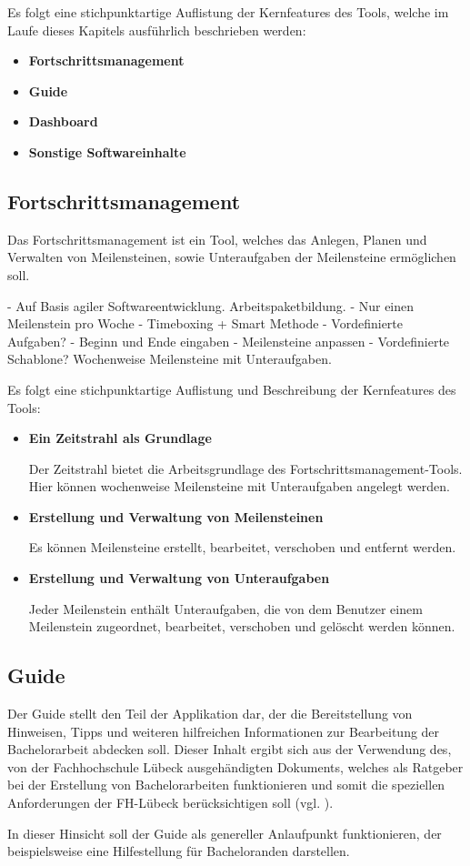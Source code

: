 \documentclass{scrreprt}
\begin{document}
\par Es folgt eine stichpunktartige Auflistung der Kernfeatures des Tools, welche im Laufe dieses Kapitels ausführlich beschrieben werden:

\begin{itemize}
\item \textbf{Fortschrittsmanagement}
\item \textbf{Guide}
\item \textbf{Dashboard}
\item \textbf{Sonstige Softwareinhalte}
\end{itemize}

\subsection{Fortschrittsmanagement}
Das Fortschrittsmanagement ist ein Tool, welches das Anlegen, Planen und Verwalten von Meilensteinen, sowie Unteraufgaben der Meilensteine ermöglichen soll. 

- Auf Basis agiler Softwareentwicklung. Arbeitspaketbildung.
- Nur einen Meilenstein pro Woche
- Timeboxing + Smart Methode
- Vordefinierte Aufgaben?
- Beginn und Ende eingaben
- Meilensteine anpassen
- Vordefinierte Schablone? Wochenweise Meilensteine mit Unteraufgaben.

Es folgt eine stichpunktartige Auflistung und Beschreibung der Kernfeatures des Tools:
\begin{itemize}
\item \textbf{Ein Zeitstrahl als Grundlage}
\par Der Zeitstrahl bietet die Arbeitsgrundlage des Fortschrittsmanagement-Tools. Hier können wochenweise Meilensteine mit Unteraufgaben angelegt werden.
\item \textbf{Erstellung und Verwaltung von Meilensteinen}
\par Es können Meilensteine erstellt, bearbeitet, verschoben und entfernt werden.
\item \textbf{Erstellung und Verwaltung von Unteraufgaben}
\par Jeder Meilenstein enthält Unteraufgaben, die von dem Benutzer einem Meilenstein zugeordnet, bearbeitet, verschoben und gelöscht werden können.
\end{itemize}

\subsection{Guide}
\par Der Guide stellt den Teil der Applikation dar, der die Bereitstellung von Hinweisen, Tipps und weiteren hilfreichen Informationen zur Bearbeitung der Bachelorarbeit abdecken soll. Dieser Inhalt ergibt sich aus der Verwendung des, von der Fachhochschule Lübeck ausgehändigten Dokuments, welches als Ratgeber bei der Erstellung von Bachelorarbeiten funktionieren und somit die speziellen Anforderungen der FH-Lübeck berücksichtigen soll (vgl. \cite[Kapitel 1]{FHLuebeckBAAnleitung}).
\par In dieser Hinsicht soll der Guide als genereller Anlaufpunkt funktionieren, der beispielsweise eine Hilfestellung für Bacheloranden darstellen.\\
\end{document}
